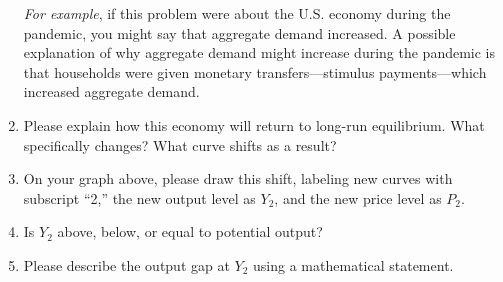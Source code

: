 \documentclass{assignment}
\begin{document}
\begin{enumerate}
\emph{For example}, if this problem were about the U.S. economy during the pandemic, you might say that aggregate demand increased. A possible explanation of why aggregate demand might increase during the pandemic is that households were given monetary transfers---stimulus payments---which increased aggregate demand.

\vfill

\item Please explain how this economy will return to long-run equilibrium. What specifically changes? What curve shifts as a result?

\vspace{4.0\baselineskip}

\item On your graph above, please draw this shift, labeling new curves with subscript ``2,'' the new output level as $Y_2$, and the new price level as $P_2$.

\item Is $Y_2$ above, below, or equal to potential output?

\vspace{3.0\baselineskip}

\item Please describe the output gap at $Y_2$ using a mathematical statement.

\vspace{2.0\baselineskip}

\end{enumerate}
\end{document}
